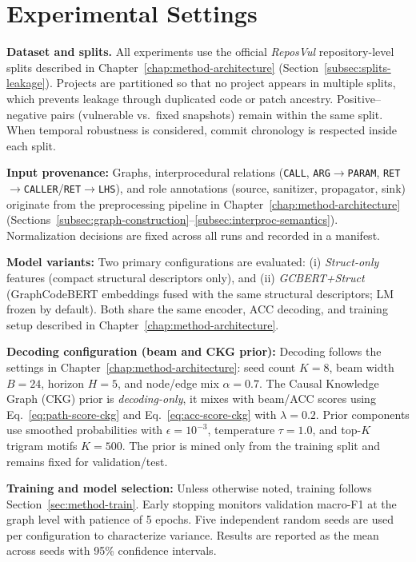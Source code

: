 \documentclass{buthesis}
\begin{document}
\section{Experimental Settings}
\label{sec:eval-settings}

\textbf{Dataset and splits.}
All experiments use the official \emph{ReposVul} repository-level splits described in Chapter~\ref{chap:method-architecture} (Section~\ref{subsec:splits-leakage}). Projects are partitioned so that no project appears in multiple splits, which prevents leakage through duplicated code or patch ancestry. Positive--negative pairs (vulnerable vs.\ fixed snapshots) remain within the same split. When temporal robustness is considered, commit chronology is respected inside each split.

\textbf{Input provenance:}
Graphs, interprocedural relations (\texttt{CALL}, \texttt{ARG}\(\to\)\texttt{PARAM}, \newline \texttt{RET}\(\to\)\texttt{CALLER}/\texttt{RET}\(\to\)\texttt{LHS}), and role annotations (source, sanitizer, propagator, sink) originate from the preprocessing pipeline in Chapter~\ref{chap:method-architecture} (Sections~\ref{subsec:graph-construction}--\ref{subsec:interproc-semantics}). Normalization decisions are fixed across all runs and recorded in a manifest.

\textbf{Model variants:}
Two primary configurations are evaluated:
(i) \emph{Struct-only} features (compact structural descriptors only), and
(ii) \emph{GCBERT+Struct} (GraphCodeBERT embeddings fused with the same structural descriptors; LM frozen by default).
Both share the same encoder, ACC decoding, and training setup described in Chapter~\ref{chap:method-architecture}.

\textbf{Decoding configuration (beam and CKG prior):}
Decoding follows the settings in Chapter~\ref{chap:method-architecture}: seed count $K{=}8$, beam width $B{=}24$, horizon $H{=}5$, and node/edge mix $\alpha{=}0.7$. The Causal Knowledge Graph (CKG) prior is \emph{decoding-only}, it mixes with beam/ACC scores using Eq.~\eqref{eq:path-score-ckg} and Eq.~\eqref{eq:acc-score-ckg} with $\lambda{=}0.2$. Prior components use smoothed probabilities with $\epsilon{=}10^{-3}$, temperature $\tau{=}1.0$, and top-$K$ trigram motifs $K{=}500$. The prior is mined only from the training split and remains fixed for validation/test.

\textbf{Training and model selection:}
Unless otherwise noted, training follows Section~\ref{sec:method-train}. Early stopping monitors validation macro-F1 at the graph level with patience of 5 epochs. Five independent random seeds are used per configuration to characterize variance. Results are reported as the mean across seeds with 95\% confidence intervals.
\end{document}
